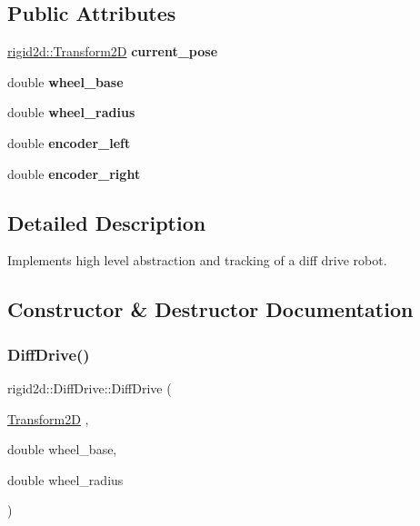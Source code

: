 \subsection*{Public Attributes}
\begin{DoxyCompactItemize}
\item 
\mbox{\label{classrigid2d_1_1DiffDrive_a6d07f9fdff01d212a975386e7798f156}} 
\hyperlink{classrigid2d_1_1Transform2D}{rigid2d\+::\+Transform2D} {\bfseries current\+\_\+pose}
\item 
\mbox{\label{classrigid2d_1_1DiffDrive_ac98ca684c26df696998545c9061bdcef}} 
double {\bfseries wheel\+\_\+base}
\item 
\mbox{\label{classrigid2d_1_1DiffDrive_aebc2a573e61f048b0e0817d38a56aa81}} 
double {\bfseries wheel\+\_\+radius}
\item 
\mbox{\label{classrigid2d_1_1DiffDrive_ae21880890a8cbcb1195a0e9e2b16fbe5}} 
double {\bfseries encoder\+\_\+left}
\item 
\mbox{\label{classrigid2d_1_1DiffDrive_ac8d8b3b66fa054874f89f52dc25ac0bc}} 
double {\bfseries encoder\+\_\+right}
\end{DoxyCompactItemize}


\subsection{Detailed Description}
Implements high level abstraction and tracking of a diff drive robot. 

\subsection{Constructor \& Destructor Documentation}
\mbox{\label{classrigid2d_1_1DiffDrive_a40b4756591df4548335371fea7bf60b4}} 
\subsubsection{\texorpdfstring{Diff\+Drive()}{DiffDrive()}}
{\footnotesize\ttfamily rigid2d\+::\+Diff\+Drive\+::\+Diff\+Drive (\begin{DoxyParamCaption}\item[{\hyperlink{classrigid2d_1_1Transform2D}{Transform2D}}]{,  }\item[{double}]{wheel\+\_\+base,  }\item[{double}]{wheel\+\_\+radius }\end{DoxyParamCaption})}



